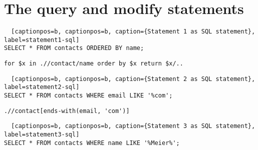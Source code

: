 \chapter{The query and modify statements}
\label{app:the-query-and-modify-statements}
\begin{lstlisting} 	[captionpos=b, captionpos=b, caption={Statement 1 as SQL statement}, label=statement1-sql]
SELECT * FROM contacts ORDERED BY name;
\end{lstlisting} 

\begin{lstlisting}[captionpos=b, caption={Statement 1 as XQuery code}, label=statement1-xquery] 
for $x in .//contact/name order by $x return $x/..
\end{lstlisting} 

\begin{lstlisting} 	[captionpos=b, captionpos=b, caption={Statement 2 as SQL statement}, label=statement2-sql]
SELECT * FROM contacts WHERE email LIKE '%com';
\end{lstlisting} 

\begin{lstlisting}[captionpos=b, caption={Statement 2 as XQuery code}, label=statement2-xquery] 
.//contact[ends-with(email, 'com')]
\end{lstlisting} 

\begin{lstlisting} 	[captionpos=b, captionpos=b, caption={Statement 3 as SQL statement}, label=statement3-sql]
SELECT * FROM contacts WHERE name LIKE '%Meier%';
\end{lstlisting} 

